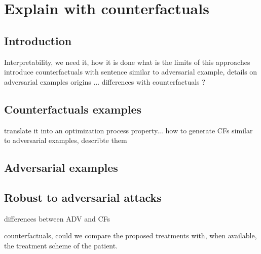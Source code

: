 \documentclass[../main.tex]{subfiles}
\begin{document}
\chapter{Explain with counterfactuals}\label{chap:counterfactuals}
\minitocpage

\section{Introduction}
 Interpretability, we need it, how it is done
 what is the limits of this approaches
 introduce counterfactuals with sentence
 similar to adversarial example, details on adversarial examples
 origins ...
 differences with counterfactuals ?
\section{Counterfactuals examples}
 translate it into an optimization process
 property...
 how to generate CFs
 similar to adversarial examples, describte them
\section{Adversarial examples}
 \cite{SzegedyZSBEGF13}
\section{Robust to adversarial attacks}

 differences between ADV and CFs





 counterfactuals, could we compare the proposed treatments with, when available, the treatment scheme of the patient.
\end{document}
